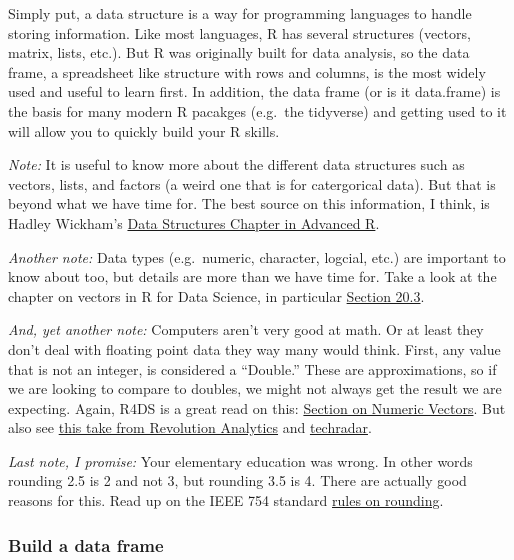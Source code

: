 \documentclass[]{article}
\begin{document}
Simply put, a data structure is a way for programming languages to
handle storing information. Like most languages, R has several
structures (vectors, matrix, lists, etc.). But R was originally built
for data analysis, so the data frame, a spreadsheet like structure with
rows and columns, is the most widely used and useful to learn first. In
addition, the data frame (or is it data.frame) is the basis for many
modern R pacakges (e.g.~the tidyverse) and getting used to it will allow
you to quickly build your R skills.

\emph{Note:} It is useful to know more about the different data
structures such as vectors, lists, and factors (a weird one that is for
catergorical data). But that is beyond what we have time for. The best
source on this information, I think, is Hadley Wickham's
\href{http://adv-r.had.co.nz/Data-structures.html}{Data Structures
Chapter in Advanced R}.

\emph{Another note:} Data types (e.g.~numeric, character, logcial, etc.)
are important to know about too, but details are more than we have time
for. Take a look at the chapter on vectors in R for Data Science, in
particular
\href{https://r4ds.had.co.nz/vectors.html\#important-types-of-atomic-vector}{Section
20.3}.

\emph{And, yet another note:} Computers aren't very good at math. Or at
least they don't deal with floating point data they way many would
think. First, any value that is not an integer, is considered a
``Double.'' These are approximations, so if we are looking to compare to
doubles, we might not always get the result we are expecting. Again,
R4DS is a great read on this:
\href{https://r4ds.had.co.nz/vectors.html\#numeric}{Section on Numeric
Vectors}. But also see
\href{https://blog.revolutionanalytics.com/2009/11/floatingpoint-errors-explained.html}{this
take from Revolution Analytics} and
\href{https://www.techradar.com/news/computing/why-computers-suck-at-maths-644771/2}{techradar}.

\emph{Last note, I promise:} Your elementary education was wrong. In
other words rounding 2.5 is 2 and not 3, but rounding 3.5 is 4. There
are actually good reasons for this. Read up on the IEEE 754 standard
\href{https://en.wikipedia.org/wiki/IEEE_754\#Rounding_rules}{rules on
rounding}.

\hypertarget{build-a-data-frame}{%
\subsubsection{Build a data frame}\label{build-a-data-frame}}
\end{document}
